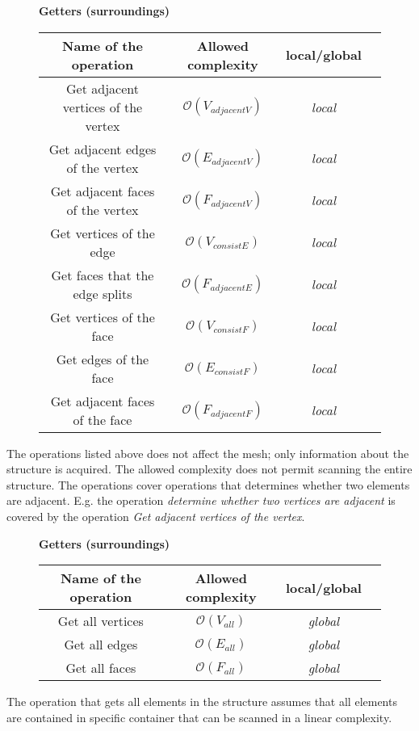 \begin{figure}[!hbf]

\centering
\textbf{Getters (surroundings)}\\
\vspace{2mm}
\begin{tabular}{| c | c | c | c |}
\hline
\textbf{Name of the operation} & \textbf{Allowed complexity} & \textbf{local/global}\\
\hline
Get adjacent vertices of the vertex& $\mathcal{O}(V_{adjacentV})$ & \emph{local}\\
\hline
Get adjacent edges of the vertex& $\mathcal{O}(E_{adjacentV})$ & \emph{local}\\
\hline
Get adjacent faces of the vertex& $\mathcal{O}(F_{adjacentV})$ & \emph{local}\\
\hline
Get vertices of the edge& $\mathcal{O}(V_{consistE})$ & \emph{local}\\
\hline
Get faces that the edge splits& $\mathcal{O}(F_{adjacentE})$ & \emph{local}\\
\hline
Get vertices of the face& $\mathcal{O}(V_{consistF})$ & \emph{local}\\
\hline
Get edges of the face& $\mathcal{O}(E_{consistF})$ & \emph{local}\\
\hline
Get adjacent faces of the face& $\mathcal{O}(F_{adjacentF})$ & \emph{local}\\
\hline
\end{tabular}
\end{figure}
The operations listed above does not affect the mesh; only information about the
structure is acquired. The allowed complexity does not permit scanning the entire structure.
The operations cover operations that determines whether two elements are adjacent.
E.g. the operation \emph{determine whether two vertices are adjacent} is covered by the
operation \emph{Get adjacent vertices of the vertex}.

\begin{figure}[!hbf]
\centering
\textbf{Getters (surroundings)}\\
\vspace{2mm}
\begin{tabular}{| c | c | c | c |}
\hline
\textbf{Name of the operation} & \textbf{Allowed complexity} & \textbf{local/global}\\
\hline
Get all vertices & $\mathcal{O}(V_{all})$ & \emph{global}\\
\hline
Get all edges & $\mathcal{O}(E_{all})$ & \emph{global}\\
\hline
Get all faces & $\mathcal{O}(F_{all})$ & \emph{global}\\
\hline
\end{tabular}
\end{figure}
The operation that gets all elements in the structure assumes that all elements are contained
in specific container that can be scanned in a linear complexity.
